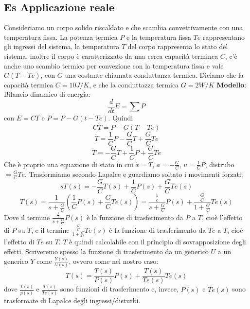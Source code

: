 \subsection{Es Applicazione reale}
Consideriamo un corpo solido riscaldato e che scambia convettivamente con una temperatura fissa.\newline
La potenza termica $P$ e la temperatura fissa $Te$ rappresentano gli ingressi del sistema, la temperatura $T$ del corpo rappresenta lo stato del sistema, inoltre il corpo è caratterizzato da una cerca capacità terminca $C$, c'è anche uno scambio termico per convezione con la temperatura fissa e vale $G(T-Te)$, con $G$ una costante chiamata conduttanza termica.\newline
Diciamo che la capacità termica $C=10J/K$, e che la conduttazza termica $G = 2 W/K$
\newline
\newline
\textbf{Modello}:\newline
Bilancio dinamico di energia:
\[
    \frac{d}{dt}E = \sum P
\] con $E = CT$ e $P = P-G(t-Te)$. \newline
Quindi
\[
    C \dot{T} = P - G(T-Te)
\]
\[
    \dot{T} = \frac{1}{C}P - \frac{G}{C} T + \frac{G}{C}Te
\]
\[
    \dot{T} = -\frac{G}{C}T + \frac{1}{C}P + \frac{G}{C}Te
\]
Che è proprio una equazione di stato in cui $\dot{x} = \dot{T}$, $a=-\frac{G}{C}$, $u=\frac{1}{C}P$, distrubo$=\frac{G}{C}Te $.\newline
Trasformiamo secondo Lapalce e guardiamo soltato i movimenti forzati:
\[
    sT(s) = - \frac{G}{C}T(s) + \frac{1}{C}P(s) + \frac{G}{C}Te(s)
\]
\[
    T(s) = \frac{1}{s+ \frac{G}{C}}( \frac{1}{C}P(s) + \frac{G}{C}Te(s)) = \frac{\frac{1}{c}}{s + \frac{G}{C}} P(s) + \frac{\frac{G}{C}}{1 + \frac{G}{C}} Te(s)
\]
Dove il termine $\frac{\frac{1}{c}}{s + \frac{G}{C}} P(s)$ è la funzione di trasferimento da $P$ a $T$, cioè l'effetto di $P$ su $T$, e il termine $\frac{\frac{G}{C}}{1 + \frac{G}{C}} Te(s)$ è la funzione di trasferimento da $Te$ a $T$, cioè l'effetto di $Te$ su $T$.\newline
$T$ è quindi calcolabile con il principio di sovrapposizione degli effetti.\newline
Scriveremo spesso la funzione di trasferimento da un generico $U$ a un generico $Y$ come $\frac{Y(s)}{U(s)}$, ovvero come nel nostro caso:
\[
    T(s) = \frac{T(s)}{P(s)}P(s) + \frac{T(s)}{Te(s)}Te(s)
\]
dove $\frac{T(s)}{p(s)}$ e $\frac{T(s)}{Te(s)}$ sono funzioni di trasferimento e, invece, $P(s)$ e $Te(s)$ sono trasformate di Lapalce degli ingressi/disturbi.\newline
